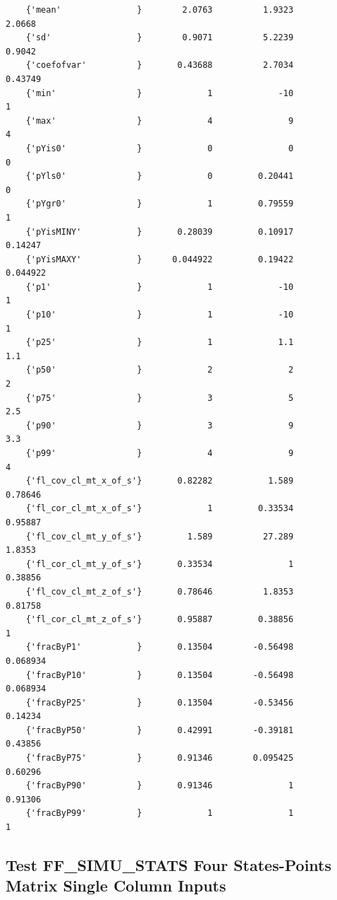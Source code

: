 \documentclass[
]{book}
\begin{document}
\begin{verbatim}
    {'mean'               }        2.0763          1.9323          2.0668  
    {'sd'                 }        0.9071          5.2239          0.9042  
    {'coefofvar'          }       0.43688          2.7034         0.43749  
    {'min'                }             1             -10               1  
    {'max'                }             4               9               4  
    {'pYis0'              }             0               0               0  
    {'pYls0'              }             0         0.20441               0  
    {'pYgr0'              }             1         0.79559               1  
    {'pYisMINY'           }       0.28039         0.10917         0.14247  
    {'pYisMAXY'           }      0.044922         0.19422        0.044922  
    {'p1'                 }             1             -10               1  
    {'p10'                }             1             -10               1  
    {'p25'                }             1             1.1             1.1  
    {'p50'                }             2               2               2  
    {'p75'                }             3               5             2.5  
    {'p90'                }             3               9             3.3  
    {'p99'                }             4               9               4  
    {'fl_cov_cl_mt_x_of_s'}       0.82282           1.589         0.78646  
    {'fl_cor_cl_mt_x_of_s'}             1         0.33534         0.95887  
    {'fl_cov_cl_mt_y_of_s'}         1.589          27.289          1.8353  
    {'fl_cor_cl_mt_y_of_s'}       0.33534               1         0.38856  
    {'fl_cov_cl_mt_z_of_s'}       0.78646          1.8353         0.81758  
    {'fl_cor_cl_mt_z_of_s'}       0.95887         0.38856               1  
    {'fracByP1'           }       0.13504        -0.56498        0.068934  
    {'fracByP10'          }       0.13504        -0.56498        0.068934  
    {'fracByP25'          }       0.13504        -0.53456         0.14234  
    {'fracByP50'          }       0.42991        -0.39181         0.43856  
    {'fracByP75'          }       0.91346        0.095425         0.60296  
    {'fracByP90'          }       0.91346               1         0.91306  
    {'fracByP99'          }             1               1               1  
\end{verbatim}

\hypertarget{test-ff_simu_stats-four-states-points-matrix-single-column-inputs}{%
\subsection{Test FF\_SIMU\_STATS Four States-Points Matrix Single Column Inputs}\label{test-ff_simu_stats-four-states-points-matrix-single-column-inputs}}
\end{document}
